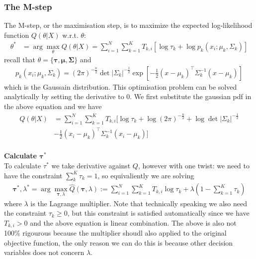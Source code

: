 \documentclass{article} [10pt] %
\newcommand{\bs}{\boldsymbol}
\begin{document}
\subsubsection{The M-step}
The M-step, or the maximisation step, is to maximize the expected log-likelihood function $Q(\theta|X)$ w.r.t. $\theta$:
\begin{align}
	\theta^* &=\arg\max_\theta Q(\theta|X)=\sum_{i=1}^N \sum_{k=1}^K T_{k, i}\left[\log\tau_k + \log p_k(x_i; \mu_k, \Sigma_k)\right]
\end{align}
recall that $\theta=\{\bs\tau, \bs\mu, \bs\Sigma\}$ and
\begin{align*}
p_k(x_i; \mu_k, \Sigma_k)= (2\pi)^{-\frac{n}{2}}\det |\Sigma_k|^{-\frac{1}{2}}\exp\left[-\frac{1}{2}(x-\mu_k)^\top\Sigma_k^{-1}(x-\mu_k)\right]
\end{align*}
which is the Gaussain distribution. This optimisation problem can be solved analytically by setting the derivative to 0. We first substitute the gaussian pdf in the above equation and we have 
\begin{align*}
Q(\theta|X)&=\sum_{i=1}^N \sum_{k=1}^K T_{k, i}[\log\tau_k + \log (2\pi)^{-\frac{n}{2}}+\log\det |\Sigma_k|^{-\frac{1}{2}}\\
	&-\frac{1}{2}(x_i-\mu_k)^\top\Sigma_k^{-1}(x_i-\mu_k)]\\
\end{align*}

\textbf{Calculate $\bs\tau^*$}\\
To calculate $\tau^*$ we take derivative against $Q$, however with one twist: we need to have the constraint $\sum_k^K\tau_k=1$, so equivaliently we are solving
\begin{align}
	\bs\tau^*, \lambda^* = \arg\max_{\bs\tau, \lambda} \hat{Q}(\bs\tau, \lambda):=\sum_{i=1}^N\sum_{k=1}^KT_{k,i}\log \tau_k + \lambda (1-\sum_{k=1}^K\tau_k)
\end{align}
where $\lambda$ is the Lagrange multiplier. Note that technically speaking we also need the constraint $\tau_k\geq 0$, but this constraint is satisfied automatically since we have $T_{k,i}>0$ and the above equation is linear combination. The above is also not 100\% rigourous because the multiplier shoudl also applied to the original objective function, the only reason we can do this is because other decision variables does not concern $\lambda$. 
\end{document}
